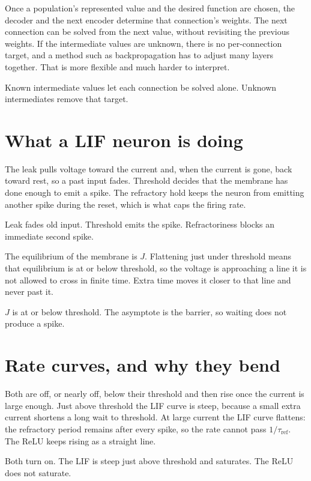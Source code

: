 \documentclass[11pt,letterpaper]{article}
\newcommand{\ans}[1]{\par\vspace{2pt}{\bfseries #1}\quad}
\begin{document}
\ans{2.}
Once a population's represented value and the desired function are chosen, the decoder and the next encoder determine that connection's weights. The next connection can be solved from the next value, without revisiting the previous weights. If the intermediate values are unknown, there is no per-connection target, and a method such as backpropagation has to adjust many layers together. That is more flexible and much harder to interpret.
\begin{result}
Known intermediate values let each connection be solved alone. Unknown intermediates remove that target.
\end{result}

\section{What a LIF neuron is doing}

\ans{1.}
The leak pulls voltage toward the current and, when the current is gone, back toward rest, so a past input fades. Threshold decides that the membrane has done enough to emit a spike. The refractory hold keeps the neuron from emitting another spike during the reset, which is what caps the firing rate.
\begin{result}
Leak fades old input. Threshold emits the spike. Refractoriness blocks an immediate second spike.
\end{result}

\ans{2.}
The equilibrium of the membrane is \(J\). Flattening just under threshold means that equilibrium is at or below threshold, so the voltage is approaching a line it is not allowed to cross in finite time. Extra time moves it closer to that line and never past it.
\begin{result}
\(J\) is at or below threshold. The asymptote is the barrier, so waiting does not produce a spike.
\end{result}

\section{Rate curves, and why they bend}

\ans{1.}
Both are off, or nearly off, below their threshold and then rise once the current is large enough. Just above threshold the LIF curve is steep, because a small extra current shortens a long wait to threshold. At large current the LIF curve flattens: the refractory period remains after every spike, so the rate cannot pass \(1/\tau_{\mathrm{ref}}\). The ReLU keeps rising as a straight line.
\begin{result}
Both turn on. The LIF is steep just above threshold and saturates. The ReLU does not saturate.
\end{result}
\end{document}
